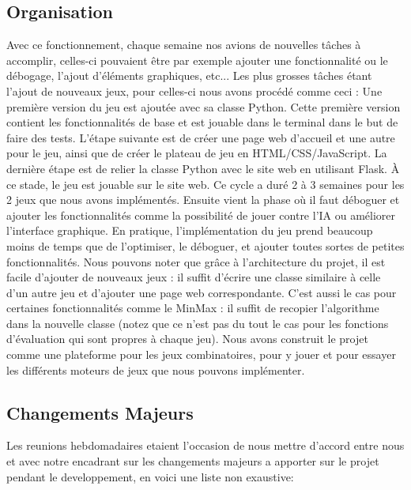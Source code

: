 \subsection{Organisation}
Avec ce fonctionnement, chaque semaine nos avions de nouvelles tâches à accomplir, celles-ci pouvaient être par exemple ajouter une fonctionnalité ou le débogage, l'ajout d'éléments graphiques, etc...
Les plus grosses tâches étant l'ajout de nouveaux jeux, pour celles-ci nous avons procédé comme ceci :
Une première version du jeu est ajoutée avec sa classe Python. Cette première version contient les fonctionnalités de base et est jouable dans le terminal dans le but de faire des tests. 
L'étape suivante est de créer une page web d'accueil et une autre pour le jeu, ainsi que de créer le plateau de jeu en HTML/CSS/JavaScript. La dernière étape est de relier la classe 
Python avec le site web en utilisant Flask.
À ce stade, le jeu est jouable sur le site web. Ce cycle a duré 2 à 3 semaines pour les 2 jeux que nous avons implémentés. Ensuite vient la phase où il faut déboguer et ajouter les 
fonctionnalités comme la possibilité de jouer contre l'IA ou améliorer l'interface graphique. En pratique, l'implémentation du jeu prend beaucoup moins de temps que de l'optimiser, 
le déboguer, et ajouter toutes sortes de petites fonctionnalités.
Nous pouvons noter que grâce à l'architecture du projet, il est facile d'ajouter de nouveaux jeux : il suffit d'écrire une classe similaire à celle d'un autre jeu et d'ajouter une 
page web correspondante. C'est aussi le cas pour certaines fonctionnalités comme le MinMax : il suffit de recopier l'algorithme dans la nouvelle classe (notez que ce n'est pas du tout le cas pour les fonctions d'évaluation qui sont propres à chaque jeu).
Nous avons construit le projet comme une plateforme pour les jeux combinatoires, pour y jouer et pour essayer les différents moteurs de jeux que nous pouvons implémenter.



\subsection{Changements Majeurs}

Les reunions hebdomadaires etaient l'occasion de nous mettre d'accord entre nous et avec notre encadrant sur
les changements majeurs a apporter sur le projet pendant le developpement, en voici une liste non exaustive:

